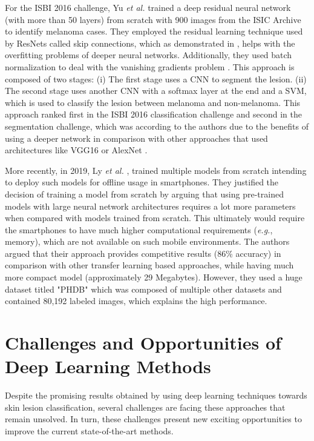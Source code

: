     For the ISBI 2016 challenge, Yu \textit{et al.} \cite{yu} trained a deep residual neural network (with more than 50 layers) from scratch with 900 images from the \ac{ISIC} Archive to identify melanoma cases. They employed the residual learning technique used by ResNets \cite{resnet} called skip connections, which as demonstrated in , helps with the overfitting problems of deeper neural networks. Additionally, they used batch normalization \cite{batchnorm} to deal with the vanishing gradients problem \cite{Ioffe2015}. This approach is composed of two stages: (i) The first stage uses a \ac{CNN} to segment the lesion. (ii) The second stage uses another \ac{CNN} with a softmax layer at the end and a \ac{SVM}, which is used to classify the lesion between melanoma and non-melanoma. This approach ranked first in the ISBI 2016 classification challenge and second in the segmentation challenge, which was according to the authors due to the benefits of using a deeper network in comparison with other approaches that used architectures like VGG16 \cite{vggnet} or AlexNet \cite{alexnet}.
    
    More recently, in 2019, Ly \textit{et al.} \cite{Ly2019}, trained multiple models from scratch intending to deploy such models for offline usage in smartphones. They justified the decision of training a model from scratch by arguing that using pre-trained models with large neural network architectures requires a lot more parameters when compared with models trained from scratch. This ultimately would require the smartphones to have much higher computational requirements (\textit{e.g.}, memory), which are not available on such mobile environments. The authors argued that their approach provides competitive results (86\% accuracy) in comparison with other transfer learning based approaches, while having much more compact model (approximately 29 Megabytes). However, they used a huge dataset titled "PHDB" which was composed of multiple other datasets and contained 80,192 labeled images, which explains the high performance.

\section{Challenges and Opportunities of Deep Learning Methods}
\label{section:limitations}

    Despite the promising results obtained by using deep learning techniques towards skin lesion classification, several challenges are facing these approaches that remain unsolved. In turn, these challenges present new exciting opportunities to improve the current state-of-the-art methods. \par
    
